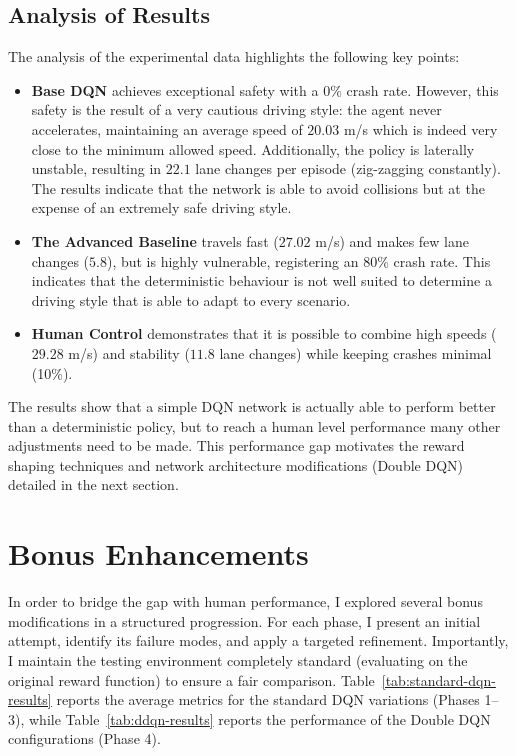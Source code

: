 \documentclass{article}
\begin{document}
\subsection{Analysis of Results}
The analysis of the experimental data highlights the following key points:
\begin{itemize}
    \item \textbf{Base DQN} achieves exceptional safety with a $0\%$ crash rate. However, this safety is the result of a very cautious driving style: the agent never accelerates, maintaining an average speed of $20.03$ m/s which is indeed very close to the minimum allowed speed. Additionally, the policy is laterally unstable, resulting in $22.1$ lane changes per episode (zig-zagging constantly). The results indicate that the network is able to avoid collisions but at the expense of an extremely safe driving style.
    \item \textbf{The Advanced Baseline} travels fast ($27.02$ m/s) and makes few lane changes ($5.8$), but is highly vulnerable, registering an $80\%$ crash rate. This indicates that the deterministic behaviour is not well suited to determine a driving style that is able to adapt to every scenario.
    \item \textbf{Human Control} demonstrates that it is possible to combine high speeds ($29.28$ m/s) and stability ($11.8$ lane changes) while keeping crashes minimal (10\%).
\end{itemize}

The results show that a simple DQN network is actually able to perform better than a deterministic policy, but to reach a human level performance many other adjustments need to be made. This performance gap motivates the reward shaping techniques and network architecture modifications (Double DQN) detailed in the next section.

\section{Bonus Enhancements}
In order to bridge the gap with human performance, I explored several bonus modifications in a structured progression. For each phase, I present an initial attempt, identify its failure modes, and apply a targeted refinement. Importantly, I maintain the testing environment completely standard (evaluating on the original reward function) to ensure a fair comparison. Table~\ref{tab:standard-dqn-results} reports the average metrics for the standard DQN variations (Phases 1--3), while Table~\ref{tab:ddqn-results} reports the performance of the Double DQN configurations (Phase 4).
\end{document}

